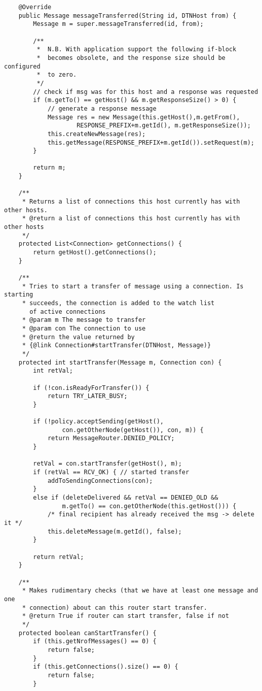 \documentclass[11pt]{icsthesis}
\begin{document}
\begin{framed}
\begin{verbatim}
	@Override
	public Message messageTransferred(String id, DTNHost from) {
		Message m = super.messageTransferred(id, from);

		/**
		 *  N.B. With application support the following if-block
		 *  becomes obsolete, and the response size should be configured 
		 *  to zero.
		 */
		// check if msg was for this host and a response was requested
		if (m.getTo() == getHost() && m.getResponseSize() > 0) {
			// generate a response message
			Message res = new Message(this.getHost(),m.getFrom(), 
					RESPONSE_PREFIX+m.getId(), m.getResponseSize());
			this.createNewMessage(res);
			this.getMessage(RESPONSE_PREFIX+m.getId()).setRequest(m);
		}
		
		return m;
	}
	
	/**
	 * Returns a list of connections this host currently has with other hosts.
	 * @return a list of connections this host currently has with other hosts
	 */
	protected List<Connection> getConnections() {
		return getHost().getConnections();
	}
	
	/**
	 * Tries to start a transfer of message using a connection. Is starting
	 * succeeds, the connection is added to the watch list 
       of active connections
	 * @param m The message to transfer
	 * @param con The connection to use
	 * @return the value returned by 
	 * {@link Connection#startTransfer(DTNHost, Message)}
	 */
	protected int startTransfer(Message m, Connection con) {
		int retVal;
		
		if (!con.isReadyForTransfer()) {
			return TRY_LATER_BUSY;
		}
		
		if (!policy.acceptSending(getHost(), 
				con.getOtherNode(getHost()), con, m)) {
			return MessageRouter.DENIED_POLICY;
		}
		
		retVal = con.startTransfer(getHost(), m);
		if (retVal == RCV_OK) { // started transfer
			addToSendingConnections(con);
		}
		else if (deleteDelivered && retVal == DENIED_OLD && 
				m.getTo() == con.getOtherNode(this.getHost())) {
			/* final recipient has already received the msg -> delete it */
			this.deleteMessage(m.getId(), false);
		}
		
		return retVal;
	}
	
	/**
	 * Makes rudimentary checks (that we have at least one message and one
	 * connection) about can this router start transfer.
	 * @return True if router can start transfer, false if not
	 */
	protected boolean canStartTransfer() {
		if (this.getNrofMessages() == 0) {
			return false;
		}
		if (this.getConnections().size() == 0) {
			return false;
		}
		

\end{verbatim}
\end{framed}
\end{document}
